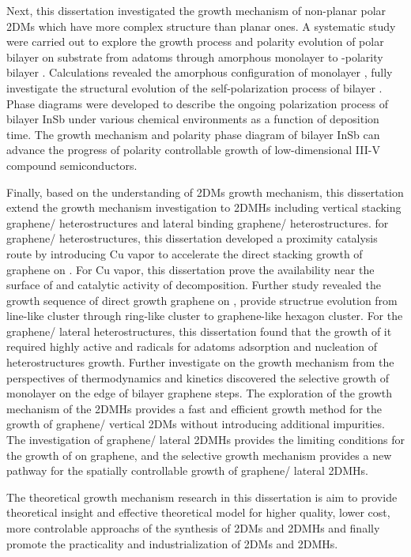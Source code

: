 \begin{englishabstract}
    Next, this dissertation investigated the growth mechanism of non-planar polar 2DMs which have more complex structure than planar ones. A systematic study were carried out to explore the growth process and polarity evolution of polar bilayer  on  substrate from adatoms through amorphous monolayer to -polarity bilayer . Calculations revealed the amorphous configuration of monolayer , fully investigate the structural evolution of the self-polarization process of bilayer . Phase diagrams were developed to describe the ongoing polarization process of bilayer InSb under various chemical environments as a function of deposition time. The growth mechanism and polarity phase diagram of bilayer InSb can advance the progress of polarity controllable growth of low-dimensional III-V compound semiconductors.

    Finally, based on the understanding of 2DMs growth mechanism, this dissertation extend the growth mechanism investigation to 2DMHs including vertical stacking graphene/  heterostructures and lateral binding graphene/ heterostructures. for graphene/  heterostructures, this dissertation developed a proximity catalysis route by introducing Cu vapor to accelerate the direct stacking growth of graphene on . For Cu vapor, this dissertation prove the availability near the surface of  and catalytic activity of  decomposition. Further study revealed the growth sequence of direct growth graphene on , provide structrue evolution from line-like cluster through ring-like cluster to graphene-like hexagon cluster. For the graphene/ lateral heterostructures, this dissertation found that the growth of it required highly active  and  radicals for adatoms adsorption and nucleation of heterostructures growth. Further investigate on the growth mechanism from the perspectives of thermodynamics and kinetics discovered the selective growth of monolayer  on the edge of bilayer graphene steps. The exploration of the growth mechanism of the 2DMHs provides a fast and efficient growth method for the growth of graphene/  vertical 2DMs without introducing additional impurities. The investigation of graphene/ lateral 2DMHs provides the limiting conditions for the growth of  on graphene, and the selective growth mechanism provides a new pathway for the spatially controllable growth of graphene/ lateral 2DMHs. 

    The theoretical growth mechanism research in this dissertation is aim to provide theoretical insight and effective theoretical model for higher quality, lower cost, more controlable approachs of the synthesis of 2DMs and 2DMHs and finally promote the practicality and industrialization of 2DMs and 2DMHs.
    
\end{englishabstract}